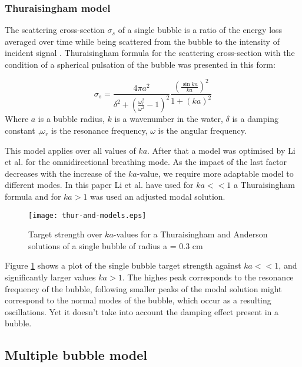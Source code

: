 \subsubsection{Thuraisingham model}
The scattering cross-section $\sigma_s$ of a single bubble is a ratio of the energy loss averaged over time while being scattered from the bubble to the intensity of incident signal \cite[p.408]{thuraisingham_new_1997}. Thuraisingham formula for the scattering cross-section with the condition of a spherical pulsation of the bubble was presented in this form: 

\begin{equation}\label{eq:thuraisingham}
    \sigma_s=\frac{4\pi a^2}{\delta^2 + (\frac{\omega_r^2}{\omega^2}-1)^2}\frac{(\frac{\sin ka}{ka})^2}{1+(ka)^2}
\end{equation}
Where $a$ is a bubble radius, $k$ is a wavenumber in the water, $\delta$ is a damping constant ,$\omega_r$  is the resonance frequency, $\omega$  is the angular frequency.

This model applies over all values of $ka$. After that a model was optimised by Li et al. \cite[]{li_broadband_2020} for the omnidirectional breathing mode. As the impact of the last factor decreases with the increase of the $ka$-value, we require more adaptable model to different modes. In this paper Li et al. have used for $ka << 1$ a Thuraisingham formula and for $ka>1$ was used an adjusted modal solution.

\begin{figure}[H]
    \centering
    \texttt{[image: thur-and-models.eps]}
    \caption*{Target strength over $ka$-values for a Thuraisingham and Anderson solutions of a single bubble of radius a = 0.3 cm}
    \label{fig:thur-anderson}
\end{figure}

Figure \ref*{fig:thur-anderson} shows a plot of the single bubble target strength against  $ka << 1$, and significantly larger values $ka > 1$. The highes peak corresponds to the resonance frequency of the bubble, following smaller peaks of the modal solution might correspond to the normal modes of the bubble, which occur as a resulting oscillations. Yet it doesn't take into account the damping effect present in a bubble.


\subsection{Multiple bubble model}

